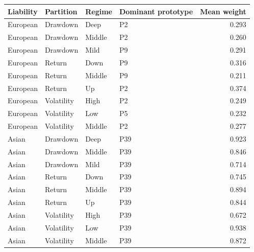 \begin{tabular}{llllr}
\toprule
Liability & Partition & Regime & Dominant prototype & Mean weight \\
\midrule
European & Drawdown & Deep & P2 & 0.293 \\
European & Drawdown & Middle & P2 & 0.260 \\
European & Drawdown & Mild & P9 & 0.291 \\
European & Return & Down & P9 & 0.316 \\
European & Return & Middle & P9 & 0.211 \\
European & Return & Up & P2 & 0.374 \\
European & Volatility & High & P2 & 0.249 \\
European & Volatility & Low & P5 & 0.232 \\
European & Volatility & Middle & P2 & 0.277 \\
Asian & Drawdown & Deep & P39 & 0.923 \\
Asian & Drawdown & Middle & P39 & 0.846 \\
Asian & Drawdown & Mild & P39 & 0.714 \\
Asian & Return & Down & P39 & 0.745 \\
Asian & Return & Middle & P39 & 0.894 \\
Asian & Return & Up & P39 & 0.844 \\
Asian & Volatility & High & P39 & 0.672 \\
Asian & Volatility & Low & P39 & 0.938 \\
Asian & Volatility & Middle & P39 & 0.872 \\
\bottomrule
\end{tabular}
